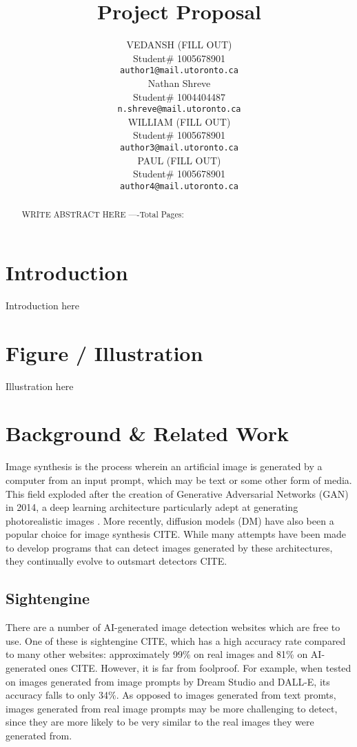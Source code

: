 \documentclass{article} %
\title{Project Proposal}
\author{VEDANSH (FILL OUT)  \\
Student\# 1005678901 \\
\texttt{author1@mail.utoronto.ca} \\
\And
Nathan Shreve  \\
Student\# 1004404487 \\
\texttt{n.shreve@mail.utoronto.ca} \\
\AND
WILLIAM (FILL OUT)  \\
Student\# 1005678901 \\
\texttt{author3@mail.utoronto.ca} \\
\And
PAUL (FILL OUT) \\
Student\# 1005678901 \\
\texttt{author4@mail.utoronto.ca} \\
\AND
}
\begin{document}
\maketitle

\begin{abstract}
WRITE ABSTRACT HERE
----Total Pages: \pageref{last_page}
\end{abstract}



\section{Introduction}
\label{intro}

Introduction here

\section{Figure / Illustration}
\label{illustration}

Illustration here

\section{Background \& Related Work}
\label{background}

Image synthesis is the process wherein an artificial image is generated by a computer from an input prompt, which may be text or some other form of media. This field exploded after the creation of Generative Adversarial Networks (GAN) in 2014, a deep learning architecture particularly adept at generating photorealistic images \citep{GANfather}. More recently, diffusion models (DM) have also been a popular choice for image synthesis CITE. While many attempts have been made to develop programs that can detect images generated by these architectures, they continually evolve to outsmart detectors CITE.

\subsection{Sightengine}

There are a number of AI-generated image detection websites which are free to use. One of these is sightengine CITE, which has a high accuracy rate compared to many other websites: approximately 99\% on real images and 81\% on AI-generated ones CITE. However, it is far from foolproof. For example, when tested on images generated from image prompts by Dream Studio and DALL-E, its accuracy falls to only 34\%. As opposed to images generated from text promts, images generated from real image prompts may be more challenging to detect, since they are more likely to be very similar to the real images they were generated from.
\end{document}
